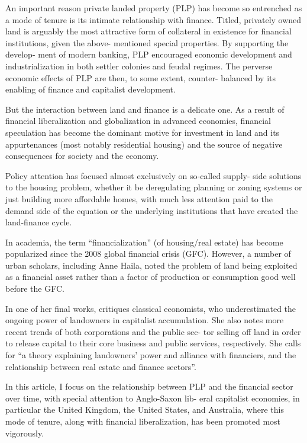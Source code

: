\documentclass[
]{book}
\begin{document}
An important reason private landed property (PLP) has become
so entrenched as a mode of tenure is its intimate relationship with
finance. Titled, privately owned land is arguably the most attractive
form of collateral in existence for financial institutions, given the
above-­
mentioned special properties. By supporting the develop-
ment of modern banking, PLP encouraged economic development
and industrialization in both settler colonies and feudal regimes. The
perverse economic effects of PLP are then, to some extent, counter-­
balanced by its enabling of finance and capitalist development.

But the interaction between land and finance is a delicate one.
As a result of financial liberalization and globalization in advanced
economies, financial speculation has become the dominant motive
for investment in land and its appurtenances (most notably residential
housing) and the source of negative consequences for society and the
economy.

Policy attention has focused almost exclusively on so-­called supply-­
side solutions to the housing problem, whether it be deregulating
planning or zoning systems or just building more affordable homes,
with much less attention paid to the demand side of the equation or
the underlying institutions that have created the land-­finance cycle.

In academia, the term ``financialization'' (of housing/real estate)
has become popularized since the 2008 global financial crisis (GFC).
However, a number of urban scholars, including Anne Haila, noted
the problem of land being exploited as a financial asset rather than
a factor of production or consumption good well before the GFC.

In one of her final works,
critiques classical economists, who underestimated
the ongoing power of landowners in capitalist accumulation. She also
notes more recent trends of both corporations and the public sec-
tor selling off land in order to release capital to their core business
and public services, respectively. She calls for ``a theory explaining
landowners' power and alliance with financiers, and the relationship
between real estate and finance sectors''.

In this article, I focus on the relationship between PLP and the
financial sector over time, with special attention to Anglo-­Saxon lib-
eral capitalist economies, in particular the United Kingdom, the United
States, and Australia, where this mode of tenure, along with financial
liberalization, has been promoted most vigorously.
\end{document}

